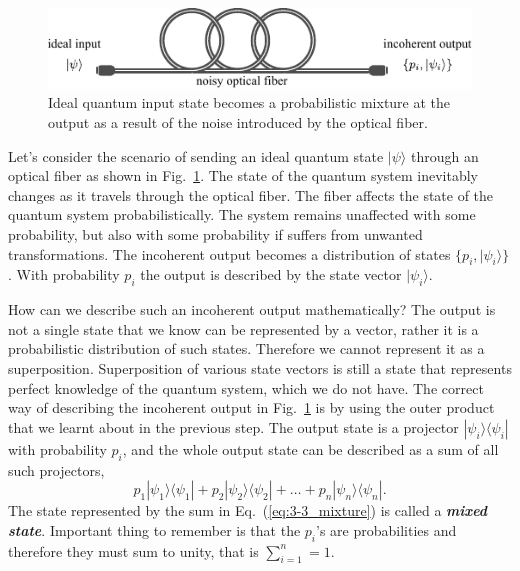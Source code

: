 \begin{figure}[t]
    \centering
    \includegraphics[width=\textwidth]{lesson3/3-3_noisy_communication.pdf}
    \caption[Noisy quantum communication]{Ideal quantum input state becomes a probabilistic mixture at the output as a result of the noise introduced by the optical fiber.}
    \label{fig:3-3_noisy_communication}
\end{figure}

Let's consider the scenario of sending an ideal quantum state $|\psi\rangle$ through an optical fiber as shown in Fig.~\ref{fig:3-3_noisy_communication}.
The state of the quantum system inevitably changes as it travels through the optical fiber.
The fiber affects the state of the quantum system probabilistically.
The system remains unaffected with some probability, but also with some probability if suffers from unwanted transformations.
The incoherent output becomes a distribution of states $\{p_i, |\psi_i\rangle\}$.
With probability $p_i$ the output is described by the state vector $|\psi_i\rangle$.

How can we describe such an incoherent output mathematically?
The output is not a single state that we know can be represented by a vector, rather it is a probabilistic distribution of such states.
Therefore we cannot represent it as a superposition.
Superposition of various state vectors is still a state that represents perfect knowledge of the quantum system, which we do not have.
The correct way of describing the incoherent output in Fig.~\ref{fig:3-3_noisy_communication} is by using the outer product that we learnt about in the previous step.
The output state is a projector $|\psi_i\rangle\langle\psi_i|$ with probability $p_i$, and the whole output state can be described as a sum of all such projectors,
\begin{equation}
    p_1 |\psi_1\rangle\langle\psi_1| + p_2 |\psi_2\rangle\langle\psi_2| + \ldots + p_n |\psi_n\rangle\langle\psi_n|.
    \label{eq:3-3_mixture}
\end{equation}
The state represented by the sum in Eq.~(\ref{eq:3-3_mixture}) is called a \textit{\textbf{mixed state}}.
Important thing to remember is that the $p_i$'s are probabilities and therefore they must sum to unity, that is $\sum_{i=1}^n=1$.

